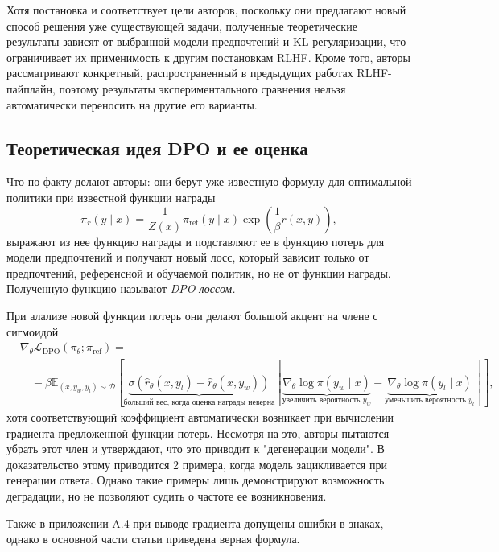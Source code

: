 \documentclass[11pt,a4paper]{article}
\theoremstyle{remark}
\begin{document}
Хотя постановка и соответствует цели авторов, поскольку они предлагают новый способ решения уже существующей задачи, полученные теоретические результаты зависят от выбранной модели предпочтений и KL-регуляризации, что ограничивает их применимость к другим постановкам RLHF. Кроме того, авторы рассматривают конкретный, распространенный в предыдущих работах RLHF-пайплайн, поэтому результаты экспериментального сравнения нельзя автоматически переносить на другие его варианты.

\subsection{Теоретическая идея DPO и ее оценка}

Что по факту делают авторы: они берут уже известную формулу для оптимальной политики при известной функции награды
\[\pi_r(y \mid x) = \frac{1}{Z(x)} \pi_{\text{ref}}(y \mid x) \exp \left( \frac{1}{\beta} r(x, y) \right),\]
выражают из нее функцию награды и подставляют ее в функцию потерь для модели предпочтений и получают новый лосс, который зависит только от предпочтений, референсной и обучаемой политик, но не от функции награды. Полученную функцию называют \textit{DPO-лоссом.}

При алализе новой функции потерь они делают большой акцент на члене с сигмоидой
\[\begin{aligned}
& \nabla_\theta \mathcal{L}_{\text{DPO}}(\pi_\theta; \pi_{\text{ref}}) = \\
& \quad - \beta \mathbb{E}_{(x, y_w, y_l) \sim \mathcal{D}} \left[ \underbrace{\sigma(\hat{r}_\theta(x, y_l) - \hat{r}_\theta(x, y_w))}_{\text{больший вес, когда оценка награды неверна}} \left[ \underbrace{\nabla_\theta \log \pi(y_w \mid x)}_{\text{увеличить вероятность } y_w} - \underbrace{\nabla_\theta \log \pi(y_l \mid x)}_{\text{уменьшить вероятность } y_l} \right] \right],
\end{aligned}\]
хотя соответствующий коэффициент автоматически возникает при вычислении градиента предложенной функции потерь. Несмотря на это, авторы пытаются убрать этот член и утверждают, что это приводит к "дегенерации модели". В доказательство этому приводится 2 примера, когда модель зацикливается при генерации ответа. Однако такие примеры лишь демонстрируют возможность деградации, но не позволяют судить о частоте ее возникновения.

Также в приложении A.4 при выводе градиента допущены ошибки в знаках, однако в основной части статьи приведена верная формула.
\end{document}
